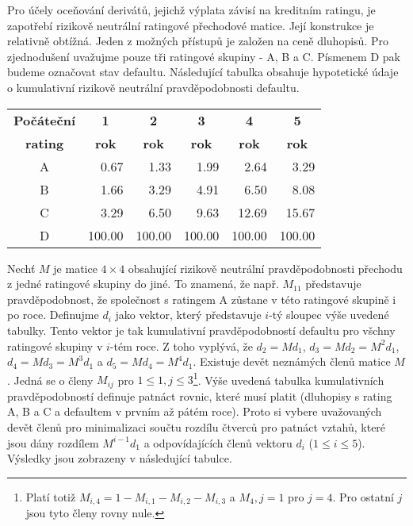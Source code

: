 \documentclass[a4paper]{book}
\begin{document}
Pro účely oceňování derivátů, jejichž výplata závisí na kreditním ratingu, je zapotřebí rizikově neutrální ratingové přechodové matice. Její konstrukce je relativně obtížná. Jeden z možných přístupů je založen na ceně dluhopisů. Pro zjednodušení uvažujme pouze tři ratingové skupiny - A, B a C. Písmenem D pak budeme označovat stav defaultu. Následující tabulka obsahuje hypotetické údaje o kumulativní rizikově neutrální pravděpodobnosti defaultu.
\begin{center}
\begin{tabular}{c r r r r r}
\textbf{Počáteční} &
\multicolumn{1}{c}{\textbf{1}} &
\multicolumn{1}{c}{\textbf{2}} &
\multicolumn{1}{c}{\textbf{3}} &
\multicolumn{1}{c}{\textbf{4}} &
\multicolumn{1}{c}{\textbf{5}} \\
\multicolumn{1}{c}{\textbf{rating}} &
\multicolumn{1}{c}{\textbf{rok}} &
\multicolumn{1}{c}{\textbf{rok}} &
\multicolumn{1}{c}{\textbf{rok}} &
\multicolumn{1}{c}{\textbf{rok}} &
\multicolumn{1}{c}{\textbf{rok}} \\
\hline
A &   0.67 &   1.33 &   1.99 &   2.64 &   3.29 \\
B &   1.66 &   3.29 &   4.91 &   6.50 &   8.08 \\
C &   3.29 &   6.50 &   9.63 &  12.69 &  15.67 \\
D & 100.00 & 100.00 & 100.00 & 100.00 & 100.00 \\
\hline
\end{tabular}
\end{center}  
Nechť $M$ je matice $4 \times 4$ obsahující rizikově neutrální pravděpodobnosti přechodu z jedné ratingové skupiny do jiné. To znamená, že např. $M_{11}$ představuje pravděpodobnost, že společnost s ratingem A zůstane v této ratingové skupině i po roce. Definujme $d_i$ jako vektor, který představuje $i$-tý sloupec výše uvedené tabulky. Tento vektor je tak kumulativní pravděpodobností defaultu pro všchny ratingové skupiny v $i$-tém roce. Z toho vyplývá, že $d_2 = Md_1$, $d_3 = Md_2 = M^2d_1$, $d_4 = Md_3=M^3d_1$ a $d_5=Md_4=M^4d_1$. Existuje devět neznámých členů matice $M$. Jedná se o členy $M_{ij}$ pro $1 \le 1, j \le 3$\footnote{Platí totiž $M_{i,4} = 1 - M_{i,1} - M_{i,2} - M_{i,3}$ a $M_4,j = 1$ pro $j = 4$. Pro ostatní $j$ jsou tyto členy rovny nule.}. Výše uvedená tabulka kumulativních pravděpodobností definuje patnáct rovnic, které musí platit (dluhopisy s rating A, B a C a defaultem v prvním až pátém roce). Proto si vybere uvažovaných devět členů pro minimalizaci součtu rozdílu čtverců pro patnáct vztahů, které jsou dány rozdílem $M^{i-1}d_1$ a odpovídajících členů vektoru $d_i$ ($1 \le i \le 5$). Výsledky jsou zobrazeny v následující tabulce.
\end{document}
